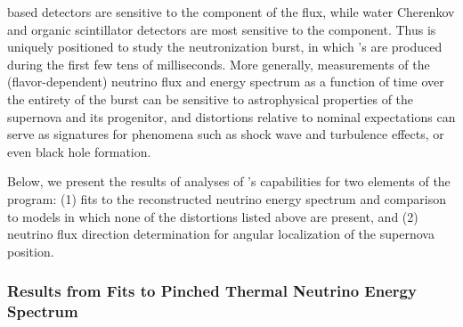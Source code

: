\lar based detectors are sensitive to the \nue 
component of the flux, while water Cherenkov and organic 
scintillator detectors are most sensitive to the \anue 
component.  Thus  is uniquely %
positioned to study the 
neutronization burst, in which \nue's are produced during the 
first few tens of milliseconds.  More generally,  
measurements of the (flavor-dependent) neutrino flux and energy 
spectrum as a function of time over the entirety of the burst 
can be sensitive to astrophysical properties of the supernova 
and its progenitor, and distortions relative to nominal 
expectations can serve as signatures for phenomena such 
as shock wave and turbulence effects, or even black hole 
formation.  

Below, we present the results of analyses 
of 's capabilities for two elements of the  
 program: (1) fits to the reconstructed 
neutrino energy spectrum and comparison to models in which 
none of the distortions listed above are present, and (2) 
neutrino flux direction determination for angular localization 
of the supernova position.

\subsubsection{Results from Fits to Pinched Thermal Neutrino Energy Spectrum}

